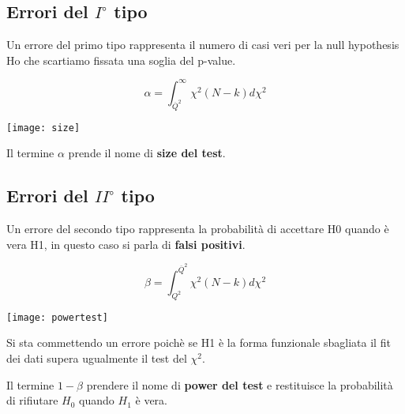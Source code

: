 \subsection{Errori del $I^{\circ}$ tipo}

Un errore del primo tipo rappresenta il numero di casi veri per la null hypothesis Ho che scartiamo fissata una soglia del p-value.

\vspace{0.3in}
\begin{minipage}{.4\textwidth}
	\begin{equation}
		\alpha = \int_{\overline{Q}^2}^{\infty}\chi^2(N-k)d\chi^2 
	\end{equation}
  \end{minipage}
  \begin{minipage}{.4\textwidth}
    \centering
    \texttt{[image: size]}	
  \end{minipage}
\vspace{0.2in}

Il termine $\alpha $ prende il nome di \textbf{size del test}. 

\subsection{Errori del $II^{\circ}$ tipo}

 Un errore del secondo tipo rappresenta la probabilit\`{a} di accettare H0 quando \`{e} vera H1, in questo caso si parla di \textbf{falsi positivi}. 
 \vspace{0.2in}
 
\begin{minipage}{.4\textwidth}
	\begin{equation}
		\beta = \int_{Q^2}^{\overline{Q}^2}\chi^2(N-k)d\chi^2 
	\end{equation}
  \end{minipage}
  \begin{minipage}{.4\textwidth}
    \centering
    \texttt{[image: powertest]}	
  \end{minipage}
\vspace{0.2in}

Si sta commettendo un errore poich\`{e} se H1 \`{e} la forma funzionale sbagliata il fit dei dati supera ugualmente il test del $\chi^2$. 

\noindent Il termine $1-\beta$ prendere il nome di \textbf{power del test} e restituisce la probabilit\`{a} di rifiutare $H_0$ quando $H_1$ \`{e} vera.
\newline

